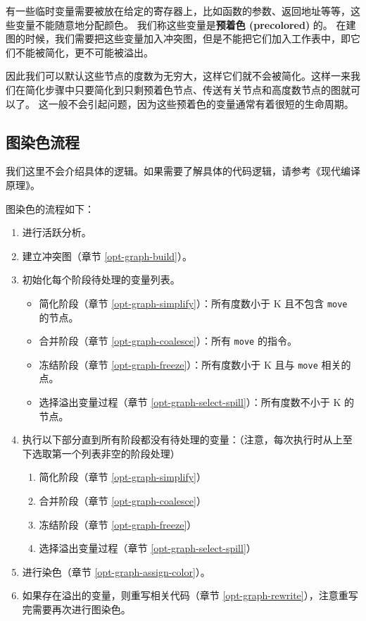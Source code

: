 有一些临时变量需要被放在给定的寄存器上，比如函数的参数、返回地址等等，这些变量不能随意地分配颜色。
我们称这些变量是\textbf{预着色 (precolored)} 的。
在建图的时候，我们需要把这些变量加入冲突图，但是不能把它们加入工作表中，即它们不能被简化，更不可能被溢出。

因此我们可以默认这些节点的度数为无穷大，这样它们就不会被简化。这样一来我们在简化步骤中只要简化到只剩预着色节点、传送有关节点和高度数节点的图就可以了。
这一般不会引起问题，因为这些预着色的变量通常有着很短的生命周期。

\subsection{图染色流程} \label{opt-graph-workflow}

\begin{remark}
我们这里不会介绍具体的逻辑。如果需要了解具体的代码逻辑，请参考《现代编译原理》\cite{TigerBook}。
\end{remark}

图染色的流程如下：
\begin{enumerate}
  \item 进行活跃分析。

  \item 建立冲突图（章节 \ref{opt-graph-build}）。

  \item 初始化每个阶段待处理的变量列表。
    \begin{itemize}
      \item 简化阶段（章节 \ref{opt-graph-simplify}）：所有度数小于 K 且不包含 \texttt{move} 的节点。
      \item 合并阶段（章节 \ref{opt-graph-coalesce}）：所有 \texttt{move} 的指令。
      \item 冻结阶段（章节 \ref{opt-graph-freeze}）：所有度数小于 K 且与 \texttt{move} 相关的点。
      \item 选择溢出变量过程（章节 \ref{opt-graph-select-spill}）：所有度数不小于 K 的节点。
    \end{itemize}

  \item 执行以下部分直到所有阶段都没有待处理的变量：（注意，每次执行时从上至下选取第一个列表非空的阶段处理）
    \begin{enumerate}
      \item 简化阶段（章节 \ref{opt-graph-simplify}）
      \item 合并阶段（章节 \ref{opt-graph-coalesce}）
      \item 冻结阶段（章节 \ref{opt-graph-freeze}）
      \item 选择溢出变量过程（章节 \ref{opt-graph-select-spill}）
    \end{enumerate}

  \item 进行染色（章节 \ref{opt-graph-assign-color}）。

  \item 如果存在溢出的变量，则重写相关代码（章节 \ref{opt-graph-rewrite}），注意重写完需要再次进行图染色。
\end{enumerate}
